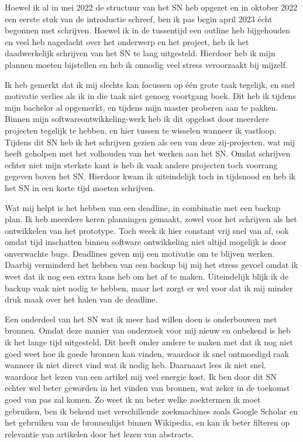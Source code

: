 Hoewel ik al in mei 2022 de structuur van het SN heb opgezet en in oktober 2022 een eerste stuk van de introductie schreef, ben ik pas begin april 2023 écht begonnen met schrijven. Hoewel ik in de tussentijd een outline heb bijgehouden en veel heb nagedacht over het onderwerp en het project, heb ik het daadwerkelijk schrijven van het SN te lang uitgesteld. Hierdoor heb ik mijn plannen moeten bijstellen en heb ik onnodig veel stress veroorzaakt bij mijzelf. 

Ik heb gemerkt dat ik mij slechts kan focussen op één grote taak tegelijk, en snel motivatie verlies als ik in die taak niet genoeg voortgang boek. Dit heb ik tijdens mijn bachelor al opgemerkt, en tijdens mijn master proberen aan te pakken. Binnen mijn softwareontwikkeling-werk heb ik dit opgelost door meerdere projecten tegelijk te hebben, en hier tussen te wisselen wanneer ik vastloop. Tijdens dit SN heb ik het schrijven gezien als een van deze zij-projecten, wat mij heeft geholpen met het volhouden van het werken aan het SN. Omdat schrijven echter niet mijn sterkste kant is heb ik vaak andere projecten toch voorrang gegeven boven het SN. Hierdoor kwam ik uiteindelijk toch in tijdsnood en heb ik het SN in een korte tijd moeten schrijven.

Wat mij helpt is het hebben van een deadline, in combinatie met een backup plan. Ik heb meerdere keren planningen gemaakt, zowel voor het schrijven als het ontwikkelen van het prototype. Toch week ik hier constant vrij snel van af, ook omdat tijd inschatten binnen software ontwikkeling niet altijd mogelijk is door onverwachte bugs. Deadlines geven mij een motivatie om te blijven werken. Daarbij verminderd het hebben van een backup bij mij het stress gevoel omdat ik weet dat ik nog een extra kans heb om het af te maken. Uiteindelijk blijk ik de backup vaak niet nodig te hebben, maar het zorgt er wel voor dat ik mij minder druk maak over het halen van de deadline.

Een onderdeel van het SN wat ik meer had willen doen is onderbouwen met bronnen. Omdat deze manier van onderzoek voor mij nieuw en onbekend is heb ik het lange tijd uitgesteld. Dit heeft onder andere te maken met dat ik nog niet goed weet hoe ik goede bronnen kan vinden, waardoor ik snel ontmoedigd raak wanneer ik niet direct vind wat ik nodig heb. Daarnaast lees ik niet snel, waardoor het lezen van een artikel mij veel energie kost. Ik ben door dit SN echter wel beter geworden in het vinden van bronnen, wat zeker in de toekomst goed van pas zal komen. Zo weet ik nu beter welke zoektermen ik moet gebruiken, ben ik bekend met verschillende zoekmachines zoals Google Scholar en het gebruiken van de bronnenlijst binnen Wikipedia, en kan ik beter filteren op relevantie van artikelen door het lezen van abstracts.

